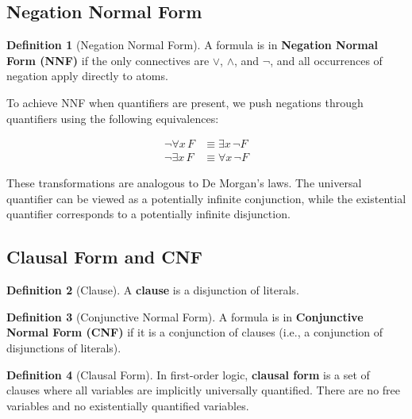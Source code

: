 \documentclass[11pt,a4paper]{article}
\theoremstyle{definition}
\newtheorem{definition}{Definition}[section]
\theoremstyle{plain}
\theoremstyle{remark}
\begin{document}
\subsection{Negation Normal Form}

\begin{definition}[Negation Normal Form]
A formula is in \textbf{Negation Normal Form (NNF)} if the only connectives are $\vee$, $\wedge$, and $\neg$, and all occurrences of negation apply directly to atoms.
\end{definition}

To achieve NNF when quantifiers are present, we push negations through quantifiers using the following equivalences:

\begin{align*}
\neg \forall x \, F &\equiv \exists x \, \neg F \\
\neg \exists x \, F &\equiv \forall x \, \neg F
\end{align*}

These transformations are analogous to De Morgan's laws. The universal quantifier can be viewed as a potentially infinite conjunction, while the existential quantifier corresponds to a potentially infinite disjunction.

\subsection{Clausal Form and CNF}

\begin{tcolorbox}[colback=blue!5!white,colframe=blue!75!black,title=\textbf{Clausal Form and CNF}]
\begin{definition}[Clause]
A \textbf{clause} is a disjunction of literals.
\end{definition}

\begin{definition}[Conjunctive Normal Form]
A formula is in \textbf{Conjunctive Normal Form (CNF)} if it is a conjunction of clauses (i.e., a conjunction of disjunctions of literals).
\end{definition}

\begin{definition}[Clausal Form]
In first-order logic, \textbf{clausal form} is a set of clauses where all variables are implicitly universally quantified. There are no free variables and no existentially quantified variables.
\end{definition}
\end{tcolorbox}
\end{document}
